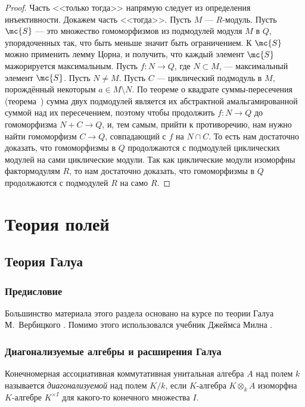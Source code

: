 \documentclass[
	extrafontsizes,
	11pt,
	hyphens,
]{memoir}
\begin{document}
\begin{proof}
Часть <<только тогда>> напрямую следует из определения инъективности. Докажем часть <<тогда>>.
Пусть \(M\) --- \(R\)-мо\-дуль.
Пусть \(\mc{S}\) --- это множество гомоморфизмов из подмодулей модуля \(M\) в \(Q\), упорядоченных
так, что быть меньше значит быть ограничением.
К \(\mc{S}\) можно применить лемму Цорна, и получить, что каждый элемент \(\mc{S}\) мажорируется максимальным.
Пусть \(f : N \to Q\), где \(N \subset M\), --- максимальный элемент \(\mc{S}\). Пусть \(N \neq M\).
Пусть \(C\) --- циклический подмодуль в \(M\), порождённый некоторым \(a \in M \setminus N\).
По теореме о квадрате суммы-пересечения (теорема~) сумма двух подмодулей является их абстрактной амальгамированной суммой над их пересечением, поэтому чтобы продолжить \(f : N \to Q\) до гомоморфизма \(N + C \to Q\), и, тем самым, прийти к противоречию, нам нужно найти гомоморфизм \(C \to Q\), совпадающий с \(f\) на \(N \cap C\).
То есть нам достаточно доказать, что гомоморфизмы в \(Q\) продолжаются с подмодулей циклических модулей на сами циклические модули. Так как циклические модули изоморфны фактормодулям \(R\), то нам достаточно доказать, что гомоморфизмы в \(Q\) продолжаются с подмодулей \(R\) на само \(R\).
\end{proof}



\chapter{Теория полей}


\section{Теория Галуа}

\subsection{Предисловие}

Большинство материала этого раздела основано на курсе по теории Галуа М.\ Вербицкого \cite{verbit_GALOIS_2013}.
Помимо этого использовался учебник Джеймса Милна \cite{milneFT_v5.10}.

\subsection{Диагонализуемые алгебры и расширения Галуа}

\begin{definition} \label{def:DiagAlg}
Конечномерная ассоциативная коммутативная унитальная алгебра \(A\) над полем \(k\) называется \emph{диагонализуемой} над полем \(K/k\),
если \(K\)-алгебра \(K \otimes_k A\) изоморфна \(K\)-алгебре \(K^{\times I}\) для какого-то конечного множества \(I\).
\end{definition}
\end{document}
